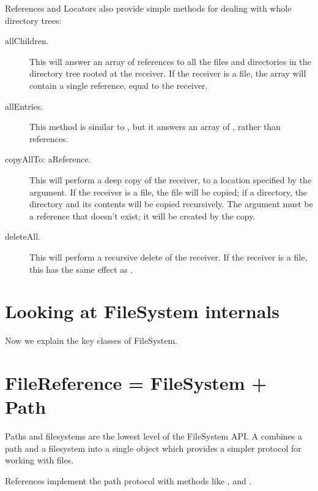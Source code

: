\documentclass[a4paper,10pt,twoside]{book}
\begin{document}
References and Locators also provide simple methods for dealing with whole directory trees:

\begin{description}
\item[allChildren.]

This will answer an array of references to all the files and directories in the directory tree rooted at the receiver. If the receiver is a file, the array will contain a single reference, equal to the receiver.

\item[allEntries.]
This method is similar to , but it answers an array of , rather than references.

\item[copyAllTo: aReference.]

This will perform a deep copy of the receiver, to a location specified by the argument. If the receiver is a file, the file will be copied; if a directory, the directory and its contents will be copied recursively. The argument must be a reference that doesn't exist; it will be created by the copy.

\item[deleteAll.]

This will perform a recursive delete of the receiver. If the receiver is a file, this has the same effect as .
\end{description}


\section{Looking at FileSystem internals}
Now we explain the key classes of FileSystem. 

\section{FileReference = FileSystem + Path}
Paths and filesystems are the lowest level of the FileSystem API. A  combines a path and a filesystem into a single object which provides a simpler protocol for working with files.


References implement the path protocol with methods like \ct{/},  and .

\end{document}
